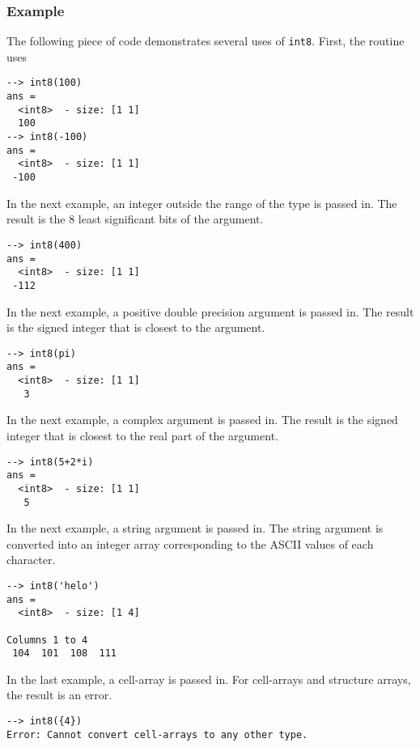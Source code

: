 \subsubsection{Example}
The following piece of code demonstrates several uses of \verb|int8|.  First, the routine uses
\begin{verbatim}
--> int8(100)
ans =
  <int8>  - size: [1 1]
  100
--> int8(-100)
ans =
  <int8>  - size: [1 1]
 -100
\end{verbatim}
In the next example, an integer outside the range  of the type is passed in.  The result is the 8 least significant bits of the argument.
\begin{verbatim}
--> int8(400)
ans =
  <int8>  - size: [1 1]
 -112
\end{verbatim}
In the next example, a positive double precision argument is passed in.  The result is the signed integer that is closest to the argument.
\begin{verbatim}
--> int8(pi)
ans =
  <int8>  - size: [1 1]
   3
\end{verbatim}
In the next example, a complex argument is passed in.  The result is the signed integer that is closest to the real part of the argument.
\begin{verbatim}
--> int8(5+2*i)
ans =
  <int8>  - size: [1 1]
   5
\end{verbatim}
In the next example, a string argument is passed in.  The string argument is converted into an integer array corresponding to the ASCII values of each character.
\begin{verbatim}
--> int8('helo')
ans =
  <int8>  - size: [1 4]
  
Columns 1 to 4
 104  101  108  111
\end{verbatim}
In the last example, a cell-array is passed in.  For cell-arrays and structure arrays, the result is an error.
\begin{verbatim}
--> int8({4})
Error: Cannot convert cell-arrays to any other type.
\end{verbatim}
